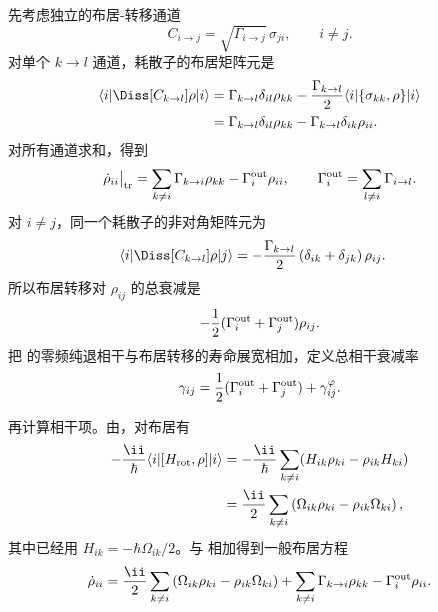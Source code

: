 先考虑独立的布居-转移通道
\[
C_{i\to j}=\sqrt{\Gamma_{i\to j}}\,\sigma_{ji},
\qquad i\ne j.
\]
对单个 $k\to l$ 通道，耗散子的布居矩阵元是
\begin{align}
\langle i|\Diss[C_{k\to l}]\rho|i\rangle
&=\Gamma_{k\to l}\delta_{il}\rho_{kk}
-\frac{\Gamma_{k\to l}}2
\langle i|\{\sigma_{kk},\rho\}|i\rangle\\
&=\Gamma_{k\to l}\delta_{il}\rho_{kk}
-\Gamma_{k\to l}\delta_{ik}\rho_{ii}.
\end{align}
对所有通道求和，得到
\begin{equation}
\dot\rho_{ii}\big|_{\rm tr}
=\sum_{k\ne i}\Gamma_{k\to i}\rho_{kk}
-\Gamma_i^{\rm out}\rho_{ii},
\qquad
\Gamma_i^{\rm out}=\sum_{l\ne i}\Gamma_{i\to l}.
\label{eq:phys-oqs-three-transfer-pop}
\end{equation}
对 $i\ne j$，同一个耗散子的非对角矩阵元为
\begin{align}
\langle i|\Diss[C_{k\to l}]\rho|j\rangle
&=-\frac{\Gamma_{k\to l}}2
\left(\delta_{ik}+\delta_{jk}\right)\rho_{ij}.
\end{align}
所以布居转移对 $\rho_{ij}$ 的总衰减是
\[
-\frac12(\Gamma_i^{\rm out}+\Gamma_j^{\rm out})\rho_{ij}.
\]
把 的零频纯退相干与布居转移的寿命展宽相加，定义总相干衰减率
\begin{equation}
\gamma_{ij}
=\frac12(\Gamma_i^{\rm out}+\Gamma_j^{\rm out})
+\gamma_{ij}^{\varphi}.
\label{eq:phys-oqs-three-gamma}
\end{equation}

再计算相干项。由，对布居有
\begin{align}
-\frac{\ii}{\hbar}\langle i|[H_{\rm rot},\rho]|i\rangle
&=-\frac{\ii}{\hbar}
\sum_{k\ne i}(H_{ik}\rho_{ki}-\rho_{ik}H_{ki})\\
&=\frac{\ii}{2}\sum_{k\ne i}
\left(\Omega_{ik}\rho_{ki}-\rho_{ik}\Omega_{ki}\right),
\end{align}
其中已经用 $H_{ik}=-\hbar\Omega_{ik}/2$。与 相加得到一般布居方程
\begin{equation}
\dot\rho_{ii}
=\frac{\ii}{2}\sum_{k\ne i}
\left(\Omega_{ik}\rho_{ki}-\rho_{ik}\Omega_{ki}\right)
+\sum_{k\ne i}\Gamma_{k\to i}\rho_{kk}
-\Gamma_i^{\rm out}\rho_{ii}.
\label{eq:phys-oqs-three-obe-pop}
\end{equation}

